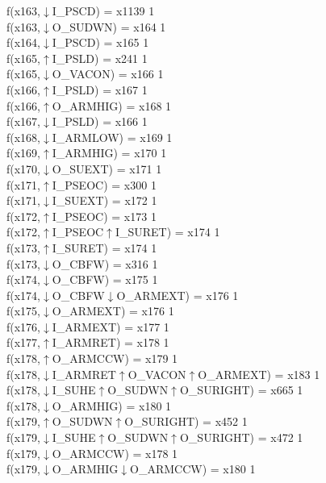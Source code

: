 f(x163,$\downarrow$I\_PSCD) = x1139 {1} \\
f(x163,$\downarrow$O\_SUDWN) = x164 {1} \\
f(x164,$\downarrow$I\_PSCD) = x165 {1} \\
f(x165,$\uparrow$I\_PSLD) = x241 {1} \\
f(x165,$\downarrow$O\_VACON) = x166 {1} \\
f(x166,$\uparrow$I\_PSLD) = x167 {1} \\
f(x166,$\uparrow$O\_ARMHIG) = x168 {1} \\
f(x167,$\downarrow$I\_PSLD) = x166 {1} \\
f(x168,$\downarrow$I\_ARMLOW) = x169 {1} \\
f(x169,$\uparrow$I\_ARMHIG) = x170 {1} \\
f(x170,$\downarrow$O\_SUEXT) = x171 {1} \\
f(x171,$\uparrow$I\_PSEOC) = x300 {1} \\
f(x171,$\downarrow$I\_SUEXT) = x172 {1} \\
f(x172,$\uparrow$I\_PSEOC) = x173 {1} \\
f(x172,$\uparrow$I\_PSEOC$\uparrow$I\_SURET) = x174 {1} \\
f(x173,$\uparrow$I\_SURET) = x174 {1} \\
f(x173,$\downarrow$O\_CBFW) = x316 {1} \\
f(x174,$\downarrow$O\_CBFW) = x175 {1} \\
f(x174,$\downarrow$O\_CBFW$\downarrow$O\_ARMEXT) = x176 {1} \\
f(x175,$\downarrow$O\_ARMEXT) = x176 {1} \\
f(x176,$\downarrow$I\_ARMEXT) = x177 {1} \\
f(x177,$\uparrow$I\_ARMRET) = x178 {1} \\
f(x178,$\uparrow$O\_ARMCCW) = x179 {1} \\
f(x178,$\downarrow$I\_ARMRET$\uparrow$O\_VACON$\uparrow$O\_ARMEXT) = x183 {1} \\
f(x178,$\downarrow$I\_SUHE$\uparrow$O\_SUDWN$\uparrow$O\_SURIGHT) = x665 {1} \\
f(x178,$\downarrow$O\_ARMHIG) = x180 {1} \\
f(x179,$\uparrow$O\_SUDWN$\uparrow$O\_SURIGHT) = x452 {1} \\
f(x179,$\downarrow$I\_SUHE$\uparrow$O\_SUDWN$\uparrow$O\_SURIGHT) = x472 {1} \\
f(x179,$\downarrow$O\_ARMCCW) = x178 {1} \\
f(x179,$\downarrow$O\_ARMHIG$\downarrow$O\_ARMCCW) = x180 {1} \\
